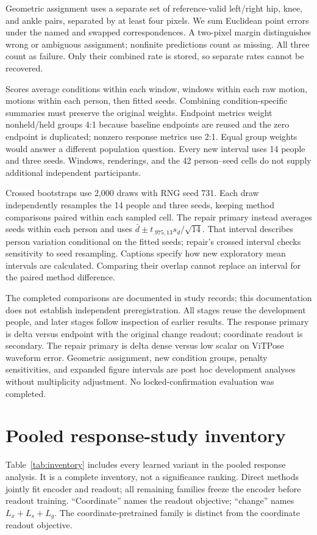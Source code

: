 Geometric assignment uses a separate set of reference-valid left/right hip, knee, and ankle pairs, separated by at least four pixels. We sum Euclidean point errors under the named and swapped correspondences. A two-pixel margin distinguishes wrong or ambiguous assignment; nonfinite predictions count as missing. All three count as failure. Only their combined rate is stored, so separate rates cannot be recovered.

Scores average conditions within each window, windows within each raw motion, motions within each person, then fitted seeds. Combining condition-specific summaries must preserve the original weights. Endpoint metrics weight nonheld/held groups 4:1 because baseline endpoints are reused and the zero endpoint is duplicated; nonzero response metrics use 2:1. Equal group weights would answer a different population question. Every new interval uses 14 people and three seeds. Windows, renderings, and the 42 person--seed cells do not supply additional independent participants.

Crossed bootstraps use 2,000 draws with RNG seed 731. Each draw independently resamples the 14 people and three seeds, keeping method comparisons paired within each sampled cell. The repair primary instead averages seeds within each person and uses $\bar d\pm t_{.975,13}s_d/\sqrt{14}$. That interval describes person variation conditional on the fitted seeds; repair's crossed interval checks sensitivity to seed resampling. Captions specify how new exploratory mean intervals are calculated. Comparing their overlap cannot replace an interval for the paired method difference.

The completed comparisons are documented in study records; this documentation does not establish independent preregistration. All stages reuse the development people, and later stages follow inspection of earlier results. The response primary is delta versus endpoint with the original change readout; coordinate readout is secondary. The repair primary is delta dense versus low scalar on ViTPose waveform error. Geometric assignment, new condition groups, penalty sensitivities, and expanded figure intervals are post hoc development analyses without multiplicity adjustment. No locked-confirmation evaluation was completed.

\clearpage
\section{Pooled response-study inventory}
\label{app:inventory}
Table~\ref{tab:inventory} includes every learned variant in the pooled response analysis. It is a complete inventory, not a significance ranking. Direct methods jointly fit encoder and readout; all remaining families freeze the encoder before readout training. ``Coordinate'' names the readout objective; ``change'' names $L_x+L_s+L_g$. The coordinate-pretrained family is distinct from the coordinate readout objective.

